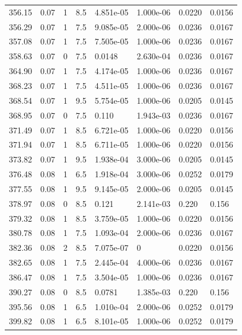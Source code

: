 \documentclass[preview]{standalone}
\begin{document}
{{{\begin{tabular}{L{1.2cm}C{1.2cm} C{0.3cm}C{0.5cm} C{1.4cm}C{1.4cm} C{1.4cm}C{1.4cm}}
  356.15  &  0.07  & 1     & 8.5 &  4.851e-05  & 1.000e-06  & 0.0220 &  0.0156   \\ 
  356.29  &  0.07  & 1     & 7.5 &  9.085e-05  & 2.000e-06  & 0.0236 &  0.0167   \\ 
  357.08  &  0.07  & 1     & 7.5 &  7.505e-05  & 1.000e-06  & 0.0236 &  0.0167   \\ 
  358.63  &  0.07  & 0     & 7.5 &  0.0148  & 2.630e-04  & 0.0236 &  0.0167   \\ 
  364.90  &  0.07  & 1     & 7.5 &  4.174e-05  & 1.000e-06  & 0.0236 &  0.0167   \\ 
  368.23  &  0.07  & 1     & 7.5 &  4.511e-05  & 1.000e-06  & 0.0236 &  0.0167   \\ 
  368.54  &  0.07  & 1     & 9.5 &  5.754e-05  & 1.000e-06  & 0.0205 &  0.0145   \\ 
  368.95  &  0.07  & 0     & 7.5 &  0.110  & 1.943e-03  & 0.0236 &  0.0167   \\ 
  371.49  &  0.07  & 1     & 8.5 &  6.721e-05  & 1.000e-06  & 0.0220 &  0.0156   \\ 
  371.94  &  0.07  & 1     & 8.5 &  6.711e-05  & 1.000e-06  & 0.0220 &  0.0156   \\ 
  373.82  &  0.07  & 1     & 9.5 &  1.938e-04  & 3.000e-06  & 0.0205 &  0.0145   \\ 
  376.48  &  0.08  & 1     & 6.5 &  1.918e-04  & 3.000e-06  & 0.0252 &  0.0179   \\ 
  377.55  &  0.08  & 1     & 9.5 &  9.145e-05  & 2.000e-06  & 0.0205 &  0.0145   \\ 
  378.97  &  0.08  & 0     & 8.5 &  0.121  & 2.141e-03  & 0.220 &  0.156   \\ 
  379.32  &  0.08  & 1     & 8.5 &  3.759e-05  & 1.000e-06  & 0.0220 &  0.0156   \\ 
  380.78  &  0.08  & 1     & 7.5 &  1.093e-04  & 2.000e-06  & 0.0236 &  0.0167   \\ 
  382.36  &  0.08  & 2     & 8.5 &  7.075e-07  & 0  & 0.0220 &  0.0156   \\ 
  382.65  &  0.08  & 1     & 7.5 &  2.445e-04  & 4.000e-06  & 0.0236 &  0.0167   \\ 
  386.47  &  0.08  & 1     & 7.5 &  3.504e-05  & 1.000e-06  & 0.0236 &  0.0167   \\ 
  390.27  &  0.08  & 0     & 8.5 &  0.0781  & 1.385e-03  & 0.220 &  0.156   \\ 
  395.56  &  0.08  & 1     & 6.5 &  1.010e-04  & 2.000e-06  & 0.0252 &  0.0179   \\ 
  399.82  &  0.08  & 1     & 6.5 &  8.101e-05  & 1.000e-06  & 0.0252 &  0.0179   \\ 

\end{tabular}}}}
\end{document}
